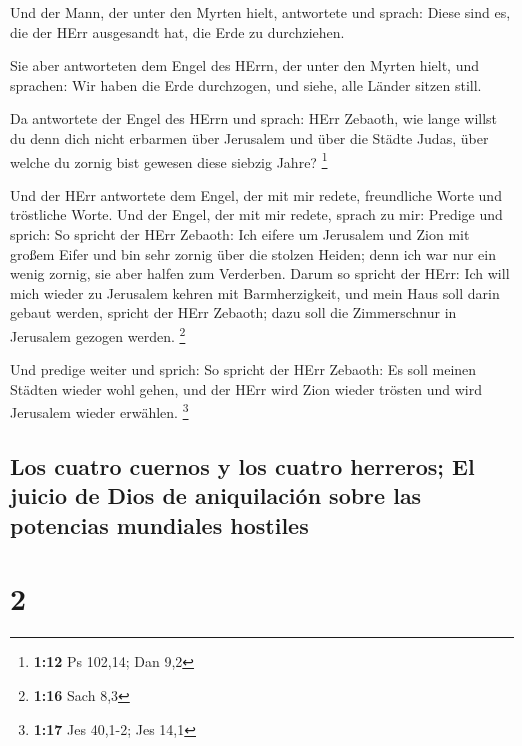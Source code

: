  Und der Mann, der unter den Myrten hielt, antwortete und
sprach: Diese sind es, die der HErr ausgesandt hat, die Erde zu
durchziehen.

 Sie aber antworteten dem Engel des HErrn, der unter den
Myrten hielt, und sprachen: Wir haben die Erde durchzogen, und siehe,
alle Länder sitzen still.

 Da antwortete der Engel des HErrn und sprach: HErr
Zebaoth, wie lange willst du denn dich nicht erbarmen über Jerusalem und
über die Städte Judas, über welche du zornig bist gewesen diese siebzig
Jahre? \footnote{\textbf{1:12} Ps 102,14; Dan 9,2}

 Und der HErr antwortete dem Engel, der mit mir redete,
freundliche Worte und tröstliche Worte.  Und der Engel,
der mit mir redete, sprach zu mir: Predige und sprich: So spricht der
HErr Zebaoth: Ich eifere um Jerusalem und Zion mit großem Eifer
 und bin sehr zornig über die stolzen Heiden; denn ich
war nur ein wenig zornig, sie aber halfen zum Verderben. 
Darum so spricht der HErr: Ich will mich wieder zu Jerusalem kehren mit
Barmherzigkeit, und mein Haus soll darin gebaut werden, spricht der HErr
Zebaoth; dazu soll die Zimmerschnur in Jerusalem gezogen werden.
\footnote{\textbf{1:16} Sach 8,3}

 Und predige weiter und sprich: So spricht der HErr
Zebaoth: Es soll meinen Städten wieder wohl gehen, und der HErr wird
Zion wieder trösten und wird Jerusalem wieder erwählen. \footnote{\textbf{1:17}
  Jes 40,1-2; Jes 14,1}

\hypertarget{los-cuatro-cuernos-y-los-cuatro-herreros-el-juicio-de-dios-de-aniquilaciuxf3n-sobre-las-potencias-mundiales-hostiles}{%
\subsection{Los cuatro cuernos y los cuatro herreros; El juicio de Dios
de aniquilación sobre las potencias mundiales
hostiles}\label{los-cuatro-cuernos-y-los-cuatro-herreros-el-juicio-de-dios-de-aniquilaciuxf3n-sobre-las-potencias-mundiales-hostiles}}

\hypertarget{section-1}{%
\section{2}\label{section-1}}

